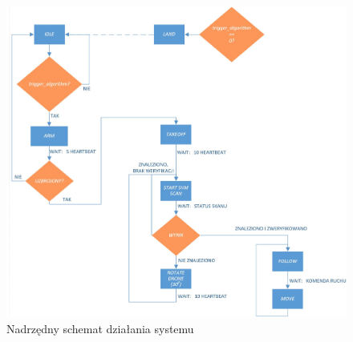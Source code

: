 \begin{figure}[h]
	\centering
	\includegraphics[width=16cm]{5_PS_FSM.jpg}
	\caption{Nadrzędny schemat działania systemu}
	\label{fig:PL_FSM_sch}
\end{figure}

